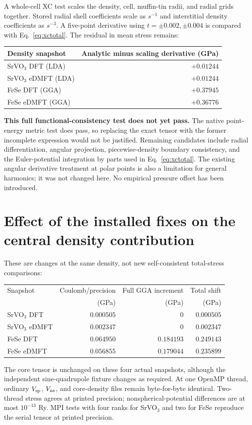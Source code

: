 \documentclass[11pt]{article}
\begin{document}
A whole-cell XC test scales the density, cell, muffin-tin radii, and radial grids together. Stored radial shell coefficients scale as $s^{-1}$ and interstitial density coefficients as $s^{-3}$. A five-point derivative using $t=\pm0.002,\pm0.004$ is compared with Eq.~\eqref{eq:xctotal}. The residual in mean stress remains:
\begin{center}
\begin{tabular}{lr}\toprule
Density snapshot & Analytic minus scaling derivative (GPa)\\\midrule
SrVO$_3$ DFT (LDA) & $+0.01244$\\
SrVO$_3$ eDMFT (LDA) & $+0.01244$\\
FeSe DFT (GGA) & $+0.37945$\\
FeSe eDMFT (GGA) & $+0.36776$\\\bottomrule
\end{tabular}
\end{center}
\textbf{This full functional-consistency test does not yet pass.} The native point-energy metric test does pass, so replacing the exact tensor with the former incomplete expression would not be justified. Remaining candidates include radial differentiation, angular projection, piecewise-density boundary consistency, and the Euler-potential integration by parts used in Eq.~\eqref{eq:xctotal}. The existing angular derivative treatment at polar points is also a limitation for general harmonics; it was not changed here. No empirical pressure offset has been introduced.

\section{Effect of the installed fixes on the central density contribution}
These are changes at the same density, not new self-consistent total-stress comparisons:
\begin{center}
\begin{tabular}{lrrr}\toprule
Snapshot & Coulomb/precision & Full GGA increment & Total shift\\
 & (GPa) & (GPa) & (GPa)\\\midrule
SrVO$_3$ DFT & $0.000505$ & $0$ & $0.000505$\\
SrVO$_3$ eDMFT & $0.002347$ & $0$ & $0.002347$\\
FeSe DFT & $0.064950$ & $0.184193$ & $0.249143$\\
FeSe eDMFT & $0.056855$ & $0.179044$ & $0.235899$\\\bottomrule
\end{tabular}
\end{center}
The core tensor is unchanged on these four actual snapshots, although the independent sine-quadrupole fixture changes as required. At one OpenMP thread, ordinary $V_{\rm sp}$, $V_{\rm ns}$, and core-density files remain byte-for-byte identical. Two-thread stress agrees at printed precision; nonspherical-potential differences are at most $10^{-13}$ Ry. MPI tests with four ranks for SrVO$_3$ and two for FeSe reproduce the serial tensor at printed precision.
\end{document}
